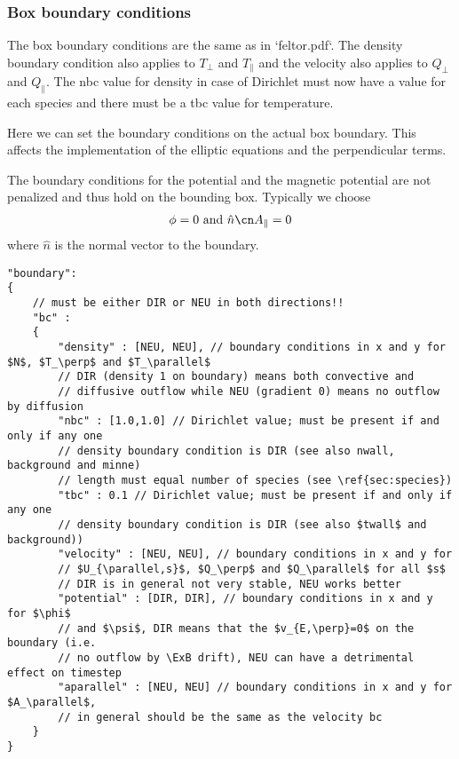 \subsubsection{Box boundary conditions}
\begin{tcolorbox}[title=Note]
The box boundary conditions are the same as in `feltor.pdf`. The density boundary
condition also applies to $T_\perp$ and $T_\parallel$ and the velocity
also applies to $Q_\perp$ and $Q_\parallel$. The nbc value for density
in case of Dirichlet must now have a value for each species and there must
be a tbc value for temperature.
\end{tcolorbox}
Here we can set the boundary conditions on the actual box boundary.
This affects the implementation of the elliptic equations and the
perpendicular terms.

The boundary conditions for the potential and the magnetic potential are not
penalized and thus hold on the bounding box. Typically we choose
\begin{align}
\phi = 0
\text{ and }  \hat n \cn A_{\parallel} = 0
\end{align}
where $\hat n$ is the normal vector to the boundary.

\begin{verbatim}
"boundary":
{
    // must be either DIR or NEU in both directions!!
    "bc" :
    {
        "density" : [NEU, NEU], // boundary conditions in x and y for $N$, $T_\perp$ and $T_\parallel$
        // DIR (density 1 on boundary) means both convective and
        // diffusive outflow while NEU (gradient 0) means no outflow by diffusion
        "nbc" : [1.0,1.0] // Dirichlet value; must be present if and only if any one
        // density boundary condition is DIR (see also nwall, background and minne)
        // length must equal number of species (see \ref{sec:species})
        "tbc" : 0.1 // Dirichlet value; must be present if and only if any one
        // density boundary condition is DIR (see also $twall$ and background))
        "velocity" : [NEU, NEU], // boundary conditions in x and y for
        // $U_{\parallel,s}$, $Q_\perp$ and $Q_\parallel$ for all $s$
        // DIR is in general not very stable, NEU works better
        "potential" : [DIR, DIR], // boundary conditions in x and y for $\phi$
        // and $\psi$, DIR means that the $v_{E,\perp}=0$ on the boundary (i.e.
        // no outflow by \ExB drift), NEU can have a detrimental effect on timestep
        "aparallel" : [NEU, NEU] // boundary conditions in x and y for $A_\parallel$,
        // in general should be the same as the velocity bc
    }
}
\end{verbatim}

